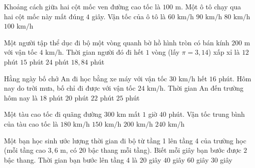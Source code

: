 \begin{ex} %
Khoảng cách giữa hai cột mốc ven đường cao tốc là $100\text{ m}$. Một ô tô chạy qua hai cột mốc này mất đúng $4$ giây. Vận tốc của ô tô là
\choice
{$60\text{ km/h}$}
{\True $90\text{ km/h}$}
{$80\text{ km/h}$}
{$100\text{ km/h}$}
\end{ex}

\begin{ex} %
Một người tập thể dục đi bộ một vòng quanh bờ hồ hình tròn có bán kính $200\text{ m}$ với vận tốc $4\text{ km/h}$. Thời gian người đó đi hết $1$ vòng (lấy $\pi = 3{,}14$) xấp xỉ là
\choice
{$12$ phút}
{$15$ phút}
{$24$ phút}
{\True $18{,}84$ phút}
\end{ex}

\begin{ex} %
Hằng ngày bố chở An đi học bằng xe máy với vận tốc $30\text{ km/h}$ hết $16$ phút. Hôm nay do trời mưa, bố chỉ đi được với vận tốc $24\text{ km/h}$. Thời gian An đến trường hôm nay là
\choice
{$18$ phút}
{\True $20$ phút}
{$22$ phút}
{$25$ phút}
\end{ex}

\begin{ex} %
Một tàu cao tốc đi quãng đường $300\text{ km}$ mất $1$ giờ $40$ phút. Vận tốc trung bình của tàu cao tốc là
\choice
{\True $180\text{ km/h}$}
{$150\text{ km/h}$}
{$200\text{ km/h}$}
{$240\text{ km/h}$}
\end{ex}

\begin{ex} %
Một bạn học sinh ước lượng thời gian đi bộ từ tầng 1 lên tầng 4 của trường học (mỗi tầng cao $3{,}6\text{ m}$, có $20$ bậc thang mỗi tầng). Biết mỗi giây bạn bước được $2$ bậc thang. Thời gian bạn bước lên tầng 4 là
\choice
{$20$ giây}
{$40$ giây}
{$60$ giây}
{\True $30$ giây}
\end{ex}

